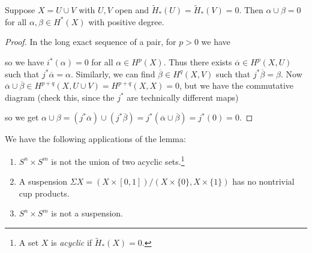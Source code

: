 \begin{lemma}
  Suppose $X = U \cup V$ with $U, V$ open
  and $\widetilde{H}_*(U) = \widetilde{H}_*(V) = 0$.
  Then $\alpha \cup \beta = 0$ for all
  $\alpha, \beta \in H^*(X)$ with positive
  degree.
\end{lemma}

\begin{proof}
  In the long exact sequence of a pair, for $p > 0$ we have
  \begin{center}
  \end{center}
  so we have $i^*(\alpha) = 0$ for all
  $\alpha \in H^p(X)$. Thus there exists
  $\overline{\alpha} \in H^p(X, U)$ such that
  $j^* \overline{\alpha} = \alpha$.
  Similarly, we can find $\overline{\beta} \in H^q(X, V)$
  such that $j^* \overline{\beta} = \beta$.
  Now $\overline{\alpha} \cup \overline{\beta} \in H^{p+q}(X, U \cup V) = H^{p + q}(X, X) = 0$,
  but we have the commutative diagram
  (check this, since the $j^*$ are technically
  different maps)
  \begin{center}
  \end{center}
  so we get $\alpha \cup \beta = (j^* \overline{\alpha}) \cup (j^* \overline{\beta}) = j^*(\overline{\alpha} \cup \overline{\beta}) = j^*(0) = 0$.
\end{proof}

\begin{example}
  We have the following applications
  of the lemma:
  \begin{enumerate}
    \item $S^n \times S^m$ is not the union of
      two acyclic sets.\footnote{A set $X$ is \emph{acyclic} if $\widetilde{H}_*(X) = 0$.}
    \item A suspension $\Sigma X = (X \times [0, 1]) / (X \times \{0\}, X \times \{1\})$
      has no nontrivial cup products.
    \item $S^n \times S^m$ is not a suspension.
  \end{enumerate}
\end{example}

